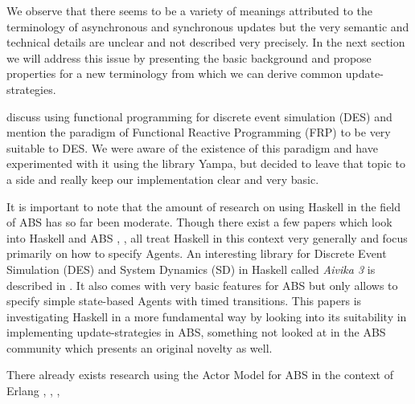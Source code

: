 \medskip

We observe that there seems to be a variety of meanings attributed to the terminology of asynchronous and synchronous updates but the very semantic and technical details are unclear and not described very precisely. In the next section we will address this issue by presenting the basic background and propose properties for a new terminology from which we can derive common update-strategies.

\cite{jankovic_functional_2007} discuss using functional programming for discrete event simulation (DES) and mention the paradigm of Functional Reactive Programming (FRP) to be very suitable to DES. We were aware of the existence of this paradigm and have experimented with it using the library Yampa, but decided to leave that topic to a side and really keep our implementation clear and very basic.

It is important to note that the amount of research on using Haskell in the field of ABS has so far been moderate. Though there exist a few papers which look into Haskell and ABS \cite{de_jong_suitability_2014}, \cite{sulzmann_specifying_2007}, \cite{jankovic_functional_2007} all treat Haskell in this context very generally and focus primarily on how to specify Agents. An interesting library for Discrete Event Simulation (DES) and System Dynamics (SD) in Haskell called \textit{Aivika 3} is described in \cite{sorokin_aivika_2015}. It also comes with very basic features for ABS but only allows to specify simple state-based Agents with timed transitions. This papers is investigating Haskell in a more fundamental way by looking into its suitability in implementing update-strategies in ABS, something not looked at in the ABS community which presents an original novelty as well.

There already exists research using the Actor Model for ABS in the context of Erlang \cite{varela_modelling_2004}, \cite{di_stefano_using_2005}, \cite{di_stefano_exat:_2007}, \cite{sher_agent-based_2013}